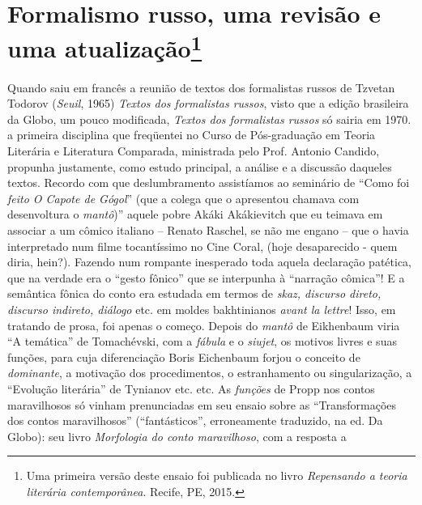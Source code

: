 \chapter{Formalismo russo, uma revisão e uma atualização\footnote{Uma
  primeira versão deste ensaio foi publicada no livro \emph{Repensando a
  teoria literária contemporânea}. Recife, PE, 2015.}}

Quando saiu em francês a reunião de textos dos formalistas russos de
Tzvetan Todorov (\emph{Seuil}, 1965) \emph{Textos dos formalistas
russos}, visto que a edição brasileira da Globo, um pouco modificada,
\emph{Textos dos formalistas russos} só sairia em 1970. a primeira
disciplina que freqüentei no Curso de Pós-graduação em Teoria Literária
e Literatura Comparada, ministrada pelo Prof. Antonio Candido, propunha
justamente, como estudo principal, a análise e a discussão daqueles
textos. Recordo com que deslumbramento assistíamos ao seminário de
``Como foi \emph{feito O Capote de Gógol}'' (que a colega que o
apresentou chamava com desenvoltura o \emph{mantô})'' aquele pobre Akáki
Akákievitch que eu teimava em associar a um cômico italiano -- Renato
Raschel, se não me engano -- que o havia interpretado num filme
tocantíssimo no Cine Coral, (hoje desaparecido - quem diria, hein?).
Fazendo num rompante inesperado toda aquela declaração patética, que na
verdade era o ``gesto fônico'' que se interpunha à ``narração cômica''!
E a semântica fônica do conto era estudada em termos de \emph{skaz,
discurso direto, discurso indireto, diálogo} etc. em moldes bakhtinianos
\emph{avant la lettre}! Isso, em tratando de prosa, foi apenas o começo.
Depois do \emph{mantô} de Eikhenbaum viria ``A temática'' de
Tomachévski, com a \emph{fábula} e o \emph{siujet}, os motivos livres e
suas funções, para cuja diferenciação Boris Eichenbaum forjou o conceito
de \emph{dominante}, a motivação dos procedimentos, o estranhamento ou
singularização, a ``Evolução literária'' de Tynianov etc. etc. As
\emph{funções} de Propp nos contos maravilhosos só vinham prenunciadas
em seu ensaio sobre as ``Transformações dos contos maravilhosos''
(``fantásticos'', erroneamente traduzido, na ed. Da Globo): seu livro
\emph{Morfologia do conto maravilhoso}, com a resposta a
